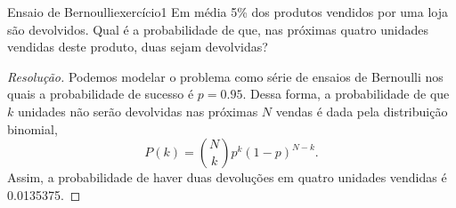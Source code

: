 \begin{exercício}{Ensaio de Bernoulli}{exercício1}
    Em média 5\% dos produtos vendidos por uma loja são devolvidos. Qual é a probabilidade de que, nas próximas quatro unidades vendidas deste produto, duas sejam devolvidas?
\end{exercício}
\begin{proof}[Resolução]
    Podemos modelar o problema como série de ensaios de Bernoulli nos quais a probabilidade de sucesso é \(p = 0.95\). Dessa forma, a probabilidade de que \(k\) unidades não serão devolvidas nas próximas \(N\) vendas é dada pela distribuição binomial,
    \begin{equation*}
        P(k) = \binom{N}{k} p^k (1-p)^{N-k}.
    \end{equation*}
    Assim, a probabilidade de haver duas devoluções em quatro unidades vendidas é 0.0135375.
\end{proof}

